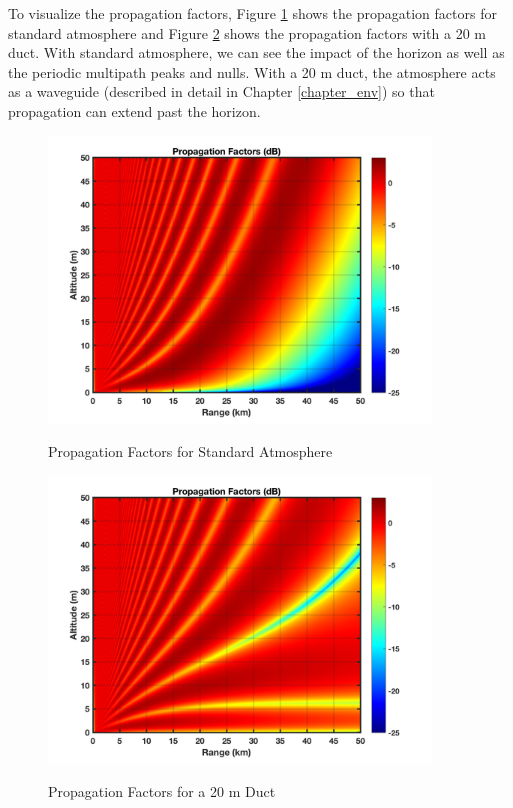 To visualize the propagation factors, Figure \ref{intro_fig:1a} shows the propagation factors for standard atmosphere and Figure \ref{intro_fig:1b} shows the propagation factors with a 20 m duct. With standard atmosphere, we can see the impact of the horizon as well as the periodic multipath peaks and nulls. With a 20 m duct, the atmosphere acts as a waveguide (described in detail in Chapter \ref{chapter_env}) so that propagation can extend past the horizon.
  \begin{figure}[H]
  \begin{center}
\includegraphics[width=4in]{../media/multistatic/std_atmos_pf.png}
  \end{center}
  \renewcommand{\baselinestretch}{1} \small\normalsize
  \begin{quote}
    \caption[Propagation Factors for Standard Atmosphere]{Propagation Factors for Standard Atmosphere \label{intro_fig:1a}}
  \end{quote}
\end{figure}
\renewcommand{\baselinestretch}{2} \small\normalsize

\begin{figure}[H]
  \begin{center}
\includegraphics[width=4in]{../media/multistatic/20m_duct_pf.png}
  \end{center}
  \renewcommand{\baselinestretch}{1} \small\normalsize
  \begin{quote}
    \caption[Propagation Factors for a 20 m Duct]{Propagation Factors for a 20 m Duct \label{intro_fig:1b}}
  \end{quote}
\end{figure}
\renewcommand{\baselinestretch}{2} \small\normalsize

